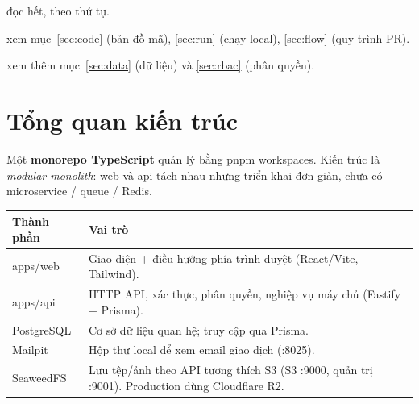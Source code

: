 \documentclass[11pt]{article}
\newcommand{\code}[1]{{\ttfamily #1}}
\begin{document}
\begin{description}[leftmargin=2.2em,style=nextline]
  \item[Người mới vào dự án] đọc hết, theo thứ tự.
  \item[Đang bắt tay code] xem mục~\ref{sec:code} (bản đồ mã), \ref{sec:run} (chạy local), \ref{sec:flow} (quy trình PR).
  \item[Làm backend] xem thêm mục~\ref{sec:data} (dữ liệu) và \ref{sec:rbac} (phân quyền).
\end{description}

\section{Tổng quan kiến trúc}
Một \textbf{monorepo TypeScript} quản lý bằng pnpm workspaces. Kiến trúc là \emph{modular monolith}:
web và api tách nhau nhưng triển khai đơn giản, chưa có microservice / queue / Redis.

\begin{center}
\end{center}

\noindent\begin{tabularx}{\textwidth}{@{}l>{\raggedright\arraybackslash}X@{}}
\toprule
\textbf{Thành phần} & \textbf{Vai trò} \\ \midrule
\code{apps/web} & Giao diện + điều hướng phía trình duyệt (React/Vite, Tailwind). \\
\code{apps/api} & HTTP API, xác thực, phân quyền, nghiệp vụ máy chủ (Fastify + Prisma). \\
PostgreSQL & Cơ sở dữ liệu quan hệ; truy cập qua Prisma. \\
Mailpit & Hộp thư local để xem email giao dịch (\code{:8025}). \\
SeaweedFS & Lưu tệp/ảnh theo API tương thích S3 (S3 \code{:9000}, quản trị \code{:9001}). Production dùng Cloudflare R2. \\ \bottomrule
\end{tabularx}
\end{document}
